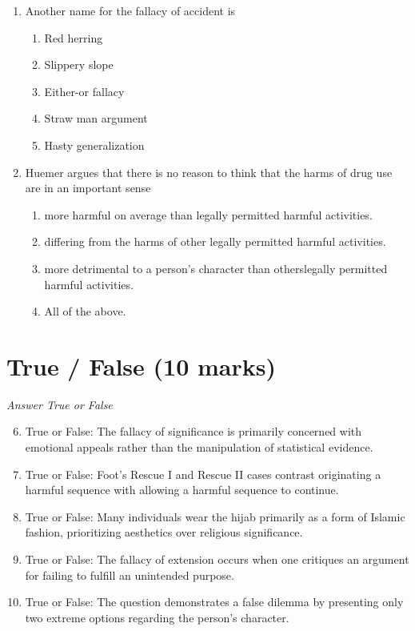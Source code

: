 \documentclass[12pt]{article}
\begin{document}
\begin{enumerate}[label=\arabic*.]
\item Another name for the fallacy of accident is
\begin{enumerate}[label=(\alph*)]
    \item Red herring
    \item Slippery slope
    \item Either-or fallacy
    \item Straw man argument
    \item Hasty generalization
\end{enumerate}
\item Huemer argues that there is no reason to think that the harms of drug use are in an important sense
\begin{enumerate}[label=(\alph*)]
    \item more harmful on average than legally permitted harmful activities.
    \item differing from the harms of other legally permitted harmful activities.
    \item more detrimental to a person's character than otherslegally permitted harmful activities.
    \item All of the above.
\end{enumerate}
\end{enumerate}

\section*{True / False (10 marks)}
\textit{Answer True or False}
\begin{enumerate}[label=\arabic*.]
\setcounter{enumi}{5}
\item True or False: The fallacy of significance is primarily concerned with emotional appeals rather than the manipulation of statistical evidence.
\item True or False: Foot's Rescue I and Rescue II cases contrast originating a harmful sequence with allowing a harmful sequence to continue.
\item True or False: Many individuals wear the hijab primarily as a form of Islamic fashion, prioritizing aesthetics over religious significance.
\item True or False: The fallacy of extension occurs when one critiques an argument for failing to fulfill an unintended purpose.
\item True or False: The question demonstrates a false dilemma by presenting only two extreme options regarding the person's character.
\end{enumerate}
\end{document}

